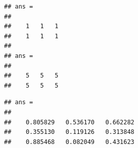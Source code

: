 \documentclass[
]{book}
\newenvironment{Shaded}{\begin{snugshade}}{\end{snugshade}}
\newcommand{\CommentTok}[1]{\textcolor[rgb]{0.56,0.35,0.01}{\textit{#1}}}
\newcommand{\FloatTok}[1]{\textcolor[rgb]{0.00,0.00,0.81}{#1}}
\newcommand{\FunctionTok}[1]{\textcolor[rgb]{0.00,0.00,0.00}{#1}}
\newcommand{\NormalTok}[1]{#1}
\newcommand{\OperatorTok}[1]{\textcolor[rgb]{0.81,0.36,0.00}{\textbf{#1}}}
\begin{document}
\begin{Shaded}
\end{Shaded}

\begin{verbatim}
## ans =
## 
##    1   1   1
##    1   1   1
## 
## ans =
## 
##    5   5   5
##    5   5   5
\end{verbatim}

\begin{Shaded}
\end{Shaded}

\begin{verbatim}
## ans =
## 
##    0.805829   0.536170   0.662282
##    0.355130   0.119126   0.313848
##    0.885468   0.082049   0.431623
\end{verbatim}

\begin{Shaded}
\end{Shaded}

\begin{Shaded}
\end{Shaded}
\end{document}
